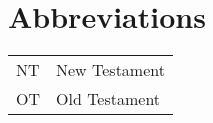\documentclass[output=paper,colorlinks,citecolor=brown]{langscibook}
\begin{document}
\section*{Abbreviations}\label{abbreviationsCR}
\begin{tabularx}{.5\textwidth}{@{}lQ@{}}
NT & New Testament \\
OT & Old Testament \\
\end{tabularx}

\sloppy
\printbibliography[heading=subbibliography,notkeyword=this]
\end{document}

